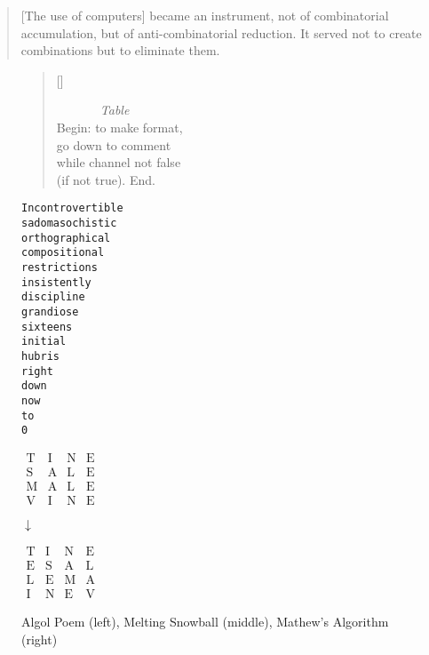 \begin{quotation}
  [The use of computers] became an instrument, not of combinatorial accumulation, but of anti-combinatorial reduction. It served not to create combinations but to eliminate them.
\end{quotation}

\begin{figure}[h!]
\begin{minipage}{.42\linewidth}
  \settowidth{\versewidth}{while channel not false} 
  \begin{verse}[\versewidth]
  \begin{patverse}\ttfamily
    ~~~~~~~\textit{Table}\\
    Begin: to make format,\\
    go down to comment\\
    while channel not false\\
      (if not true). End.\\ 
  \end{patverse}
  \end{verse}
\end{minipage}
\begin{minipage}{.32\linewidth}
  \begin{alltt}\ttfamily\centering
    Incontrovertible
    sadomasochistic
    orthographical
    compositional
    restrictions 
    insistently
    discipline
    grandiose
    sixteens
    initial
    hubris
    right
    down
    now
    to
    0
  \end{alltt}
\end{minipage}
\begin{minipage}{.24\linewidth}
  \centering
  $\begin{matrix}
    \text{T}&\text{I}&\text{N}&\text{E}\\
    \text{S}&\text{A}&\text{L}&\text{E}\\
    \text{M}&\text{A}&\text{L}&\text{E}\\
    \text{V}&\text{I}&\text{N}&\text{E}
  \end{matrix}$

  \vspace{5mm}

  $\downarrow$

  \vspace{5mm}

  $\begin{matrix}
    \text{T}&\text{I}&\text{N}&\text{E}\\
    \text{E}&\text{S}&\text{A}&\text{L}\\
    \text{L}&\text{E}&\text{M}&\text{A}\\
    \text{I}&\text{N}&\text{E}&\text{V}
  \end{matrix}$
\end{minipage}
\caption[Algol Poem, Melting Snowball, Mathew's Algorithm]{Algol Poem (left), Melting Snowball (middle), Mathew's Algorithm (right)}
\label{fig:poems}
\end{figure}

